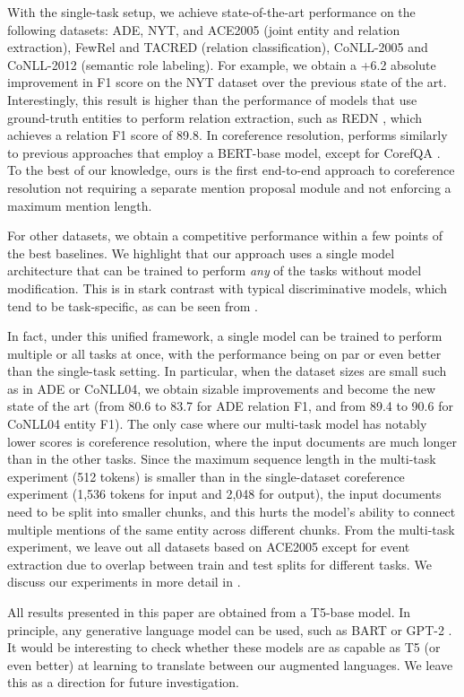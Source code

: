With the single-task setup, we achieve state-of-the-art performance on the following datasets: ADE, NYT, and ACE2005 (joint entity and relation extraction), FewRel and TACRED (relation classification), CoNLL-2005 and CoNLL-2012 (semantic role labeling). 
For example, we obtain a +6.2 absolute improvement in F1 score on the NYT dataset over the previous state of the art.
Interestingly, this result is higher than the performance of models that use ground-truth entities to perform relation extraction, such as REDN \citep{REDN}, which achieves a relation F1 score of 89.8. %
In coreference resolution, \ourmodel{} performs similarly to previous approaches that employ a BERT-base model, except for CorefQA \citep{CorefQA}.
To the best of our knowledge, ours is the first end-to-end approach to coreference resolution not requiring a separate mention proposal module and not enforcing a maximum mention length.

For other datasets, we obtain a competitive performance within a few points of the best baselines. 
We highlight that our approach uses a single model architecture that can be trained to perform \emph{any} of the tasks without model modification. This is in stark contrast with typical discriminative models, which tend to be task-specific, as can be seen from .

In fact, under this unified framework, a single model can be trained to perform multiple or all tasks at once, with the performance being on par or even better than the single-task setting. %
In particular, when the dataset sizes are small such as in ADE or CoNLL04, we obtain sizable improvements and become the new state of the art (from 80.6 to 83.7 for ADE relation F1, and from 89.4 to 90.6 for CoNLL04 entity F1).
The only case where our multi-task model has notably lower scores is coreference resolution, where the input documents are much longer than in the other tasks.
Since the maximum sequence length in the multi-task experiment (512 tokens) is smaller than in the single-dataset coreference experiment (1,536 tokens for input and 2,048 for output), the input documents need to be split into smaller chunks, and this hurts the model's ability to connect multiple mentions of the same entity across different chunks.
From the multi-task experiment, we leave out all datasets based on ACE2005 except for event extraction due to overlap between train and test splits for different tasks.
We discuss our experiments in more detail in .

All results presented in this paper are obtained from a \pretrained T5-base model.
In principle, any \pretrained generative language model can be used, such as BART \citep{bart} or GPT-2 \citep{gpt2}.
It would be interesting to check whether these models are as capable as T5 (or even better) at learning to translate between our augmented languages.
We leave this as a direction for future investigation.

